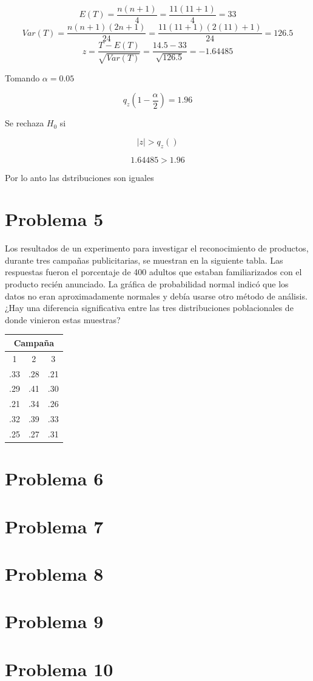 \documentclass{article}
\begin{document}
\[
    E(T) = \frac{n(n + 1)}{4} = \frac{11(11 + 1)}{4} = 33
\]
\[
    Var(T) = \frac{n(n + 1)(2n + 1)}{24} = \frac{11(11 + 1)(2(11) + 1)}{24} =126.5
\]
\[
    z = \frac{T - E(T)}{\sqrt{Var(T)}} = \frac{14.5 - 33}{\sqrt{126.5}} = -1.64485
\]

Tomando $\alpha = 0.05$

\[q_z(1 - \frac{\alpha}{2}) = 1.96\]

Se rechaza $H_0$ si

\[|z| > q_z()\]

\[1.64485 > 1.96\]

Por lo anto las dstribuciones son iguales

\section{Problema 5}
Los resultados de un experimento para investigar el reconocimiento de productos, durante tres campañas publicitarias, se muestran en la siguiente tabla. Las respuestas fueron el porcentaje de 400 adultos que estaban familiarizados con el producto recién anunciado. La gráfica de probabilidad normal indicó que los datos no eran aproximadamente normales y debía usarse otro método de análisis. ¿Hay una diferencia significativa entre las tres distribuciones poblacionales de donde vinieron estas muestras?


\begin{center}
    \begin{tabular}{c |c |c}
        \multicolumn{3}{c}{Campaña} \\
        \hline
        1   & 2   & 3               \\
        .33 & .28 & .21             \\
        .29 & .41 & .30             \\
        .21 & .34 & .26             \\
        .32 & .39 & .33             \\
        .25 & .27 & .31             \\
    \end{tabular}
\end{center}


\section{Problema 6}
\section{Problema 7}
\section{Problema 8}
\section{Problema 9}
\section{Problema 10}
\end{document}
